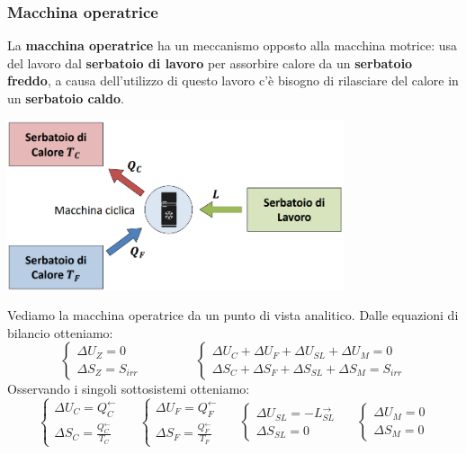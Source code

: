 \subsubsection{Macchina operatrice}
La \textbf{macchina operatrice} ha un meccanismo opposto alla macchina motrice: usa del lavoro dal \textbf{serbatoio di lavoro} per assorbire calore da un \textbf{serbatoio freddo}, a causa dell'utilizzo di questo lavoro c'è bisogno di rilasciare del calore in un \textbf{serbatoio caldo}.
\begin{center}
    \includegraphics[height=5cm]{../L05/img3.PNG}
\end{center}
Vediamo la macchina operatrice da un punto di vista analitico.\newline
Dalle equazioni di bilancio otteniamo:
\[
    \begin{cases}
        \Delta U_Z = 0\\ \Delta S_Z = S_{irr}
    \end{cases} \;\;\;\;\;\;\;\;\;\;\;\;\;\;\; \begin{cases}
        \Delta U_C + \Delta U_F + \Delta U_{SL} + \Delta U_M = 0 \\
        \Delta S_C + \Delta S_F + \Delta S_{SL} + \Delta S_M = S_{irr}
    \end{cases}
\]
Osservando i singoli sottosistemi otteniamo:
\[
    \begin{cases}
        \Delta U_C = Q_C^\leftarrow \\ \Delta S_C = \frac{Q_C^\leftarrow }{T_C}
    \end{cases} \;\;\;\;\; \begin{cases}
        \Delta U_F = Q_F^\leftarrow \\ \Delta S_F = \frac{Q_F^\leftarrow}{T_F}
    \end{cases} \;\;\;\;\; \begin{cases}
        \Delta U_{SL} = - L_{SL}^\rightarrow \\ \Delta S_{SL} = 0
    \end{cases} \;\;\;\;\; \begin{cases}
        \Delta U_M = 0\\ \Delta S_M = 0
    \end{cases}
\]
